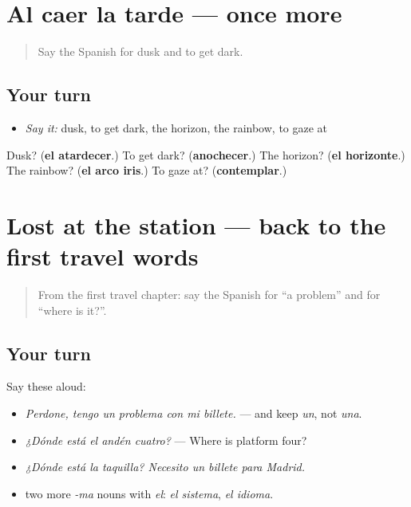 \section[(dialogue)]{Al caer la tarde — once more}

\label{lesson:ES-R703-repaso-final-703}



\begin{quote}
Say the Spanish for dusk and to get dark.
\end{quote}

\subsection*{Your turn}
\begin{itemize}
\raggedright
  \item \emph{Say it:} dusk, to get dark, the horizon, the rainbow, to gaze at
\end{itemize}

\begin{tcolorbox}[breakable,colback=teal!4,colframe=teal!35!black,title={Before you move on}]
Dusk? (\textbf{el atardecer}.) To get dark? (\textbf{anochecer}.) The horizon? (\textbf{el horizonte}.) The rainbow? (\textbf{el arco iris}.) To gaze at? (\textbf{contemplar}.)
\end{tcolorbox}
\section[(dialogue)]{Lost at the station — back to the first travel words}

\label{lesson:ES-R703-repaso-problemas-de-viaje}



\begin{quote}
From the first travel chapter: say the Spanish for \textquotedblleft{}a problem\textquotedblright{} and for \textquotedblleft{}where is it?\textquotedblright{}.
\end{quote}

\subsection*{Your turn}
Say these aloud:

\begin{itemize}
\raggedright
  \item \emph{Perdone, tengo un problema con mi billete.} — and keep \emph{un}, not \emph{una}.
  \item \emph{¿Dónde está el andén cuatro?} — Where is platform four?
  \item \emph{¿Dónde está la taquilla? Necesito un billete para Madrid.}
  \item two more \emph{-ma} nouns with \emph{el}: \emph{el sistema}, \emph{el idioma}.
\end{itemize}

